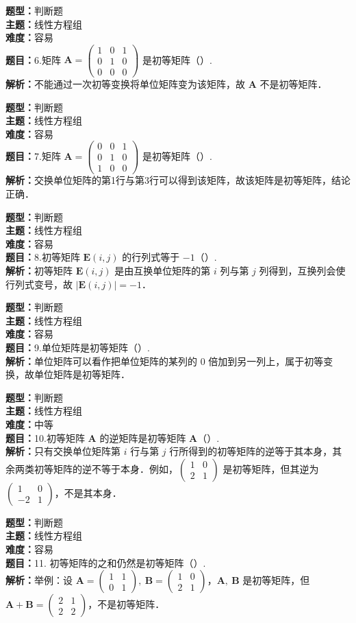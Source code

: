 \documentclass{ctexart}
\newenvironment{question}[5]{%
	\noindent\textbf{题型：}#1\\
	\textbf{主题：}#2\\
	\textbf{难度：}#3\\
	\textbf{题目：}#4\\
	\textbf{解析：}#5\\
	\vspace{1em}
}{}
\begin{document}
	\begin{question}
		{判断题}
		{线性方程组}
		{容易}
		{6.矩阵 \(\mathbf{A}=\begin{pmatrix}1 & 0 & 1 \\ 0 & 1 & 0 \\ 0 & 0 & 0\end{pmatrix}\) 是初等矩阵（）. }
		{不能通过一次初等变换将单位矩阵变为该矩阵，故 \(\mathbf{A}\) 不是初等矩阵．}
	\end{question}
	
	\begin{question}
		{判断题}
		{线性方程组}
		{容易}
		{7.矩阵 \(\mathbf{A}=\begin{pmatrix}0 & 0 & 1 \\ 0 & 1 & 0 \\ 1 & 0 & 0\end{pmatrix}\) 是初等矩阵（）. }
		{交换单位矩阵的第1行与第3行可以得到该矩阵，故该矩阵是初等矩阵，结论正确．}
	\end{question}
	
	\begin{question}
		{判断题}
		{线性方程组}
		{容易}
		{8.初等矩阵 \(\mathbf{E}(i,j)\) 的行列式等于 \(-1\)（）. }
		{初等矩阵 \(\mathbf{E}(i,j)\) 是由互换单位矩阵的第 \(i\) 列与第 \(j\) 列得到，互换列会使行列式变号，故 \(|\mathbf{E}(i,j)| = -1\)．}
	\end{question}
	
	\begin{question}
		{判断题}
		{线性方程组}
		{容易}
		{9.单位矩阵是初等矩阵（）. }
		{单位矩阵可以看作把单位矩阵的某列的 \(0\) 倍加到另一列上，属于初等变换，故单位矩阵是初等矩阵．}
	\end{question}
	
	\begin{question}
		{判断题}
		{线性方程组}
		{中等}
		{10.初等矩阵 \(\mathbf{A}\) 的逆矩阵是初等矩阵 \(\mathbf{A}\)（）. }
		{只有交换单位矩阵第 \(i\) 行与第 \(j\) 行所得到的初等矩阵的逆等于其本身，其余两类初等矩阵的逆不等于本身．例如，\(\begin{pmatrix}1 & 0 \\ 2 & 1\end{pmatrix}\) 是初等矩阵，但其逆为 \(\begin{pmatrix}1 & 0 \\ -2 & 1\end{pmatrix}\)，不是其本身．}
	\end{question}
	
	
	\begin{question}
		{判断题}
		{线性方程组}
		{容易}
		{11. 初等矩阵的之和仍然是初等矩阵（）. }
		{举例：设 \(\mathbf{A}=\begin{pmatrix}1 & 1 \\ 0 & 1\end{pmatrix},\ \mathbf{B}=\begin{pmatrix}1 & 0 \\ 2 & 1\end{pmatrix}\)，\(\mathbf{A},\ \mathbf{B}\) 是初等矩阵，但 \(\mathbf{A}+\mathbf{B}=\begin{pmatrix}2 & 1 \\ 2 & 2\end{pmatrix}\)，不是初等矩阵．}
	\end{question}
	
\end{document}
